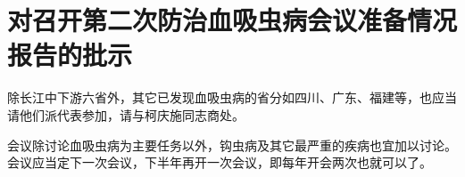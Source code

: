 \section[对召开第二次防治血吸虫病会议准备情况报告的批示（一九五六年三月七日）]{对召开第二次防治血吸虫病会议准备情况报告的批示}


除长江中下游六省外，其它已发现血吸虫病的省分如四川、广东、福建等，也应当请他们派代表参加，请与柯庆施同志商处。

会议除讨论血吸虫病为主要任务以外，钩虫病及其它最严重的疾病也宜加以讨论。会议应当定下一次会议，下半年再开一次会议，即每年开会两次也就可以了。


